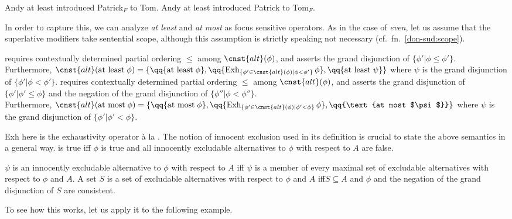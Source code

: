 \documentclass[output=paper]{langscibook}
\begin{document}
\ea
  \ea Andy at least introduced Patrick$_F$ to Tom.
  \ex Andy at least introduced Patrick to Tom$_F$.
  \z
\z

\noindent In order to capture this, we can analyze \textit{at least} and \textit{at most} as focus sensitive operators. As in the case of \textit{even}, let us assume that the superlative modifiers take sentential scope, although this assumption is strictly speaking not necessary (cf.\ fn.~\ref{don-sud:scope}).

\eanoraggedright
  \eanoraggedright
   requires contextually determined partial ordering $\leq$ among $\cnst{alt}(\phi)$, and asserts the grand disjunction of $\{\phi' | \phi \leq \phi'\}$.\smallskip\\Furthermore, $\cnst{alt}(\text{at least}\;\phi)=\{\qq{\text{at least} \;\phi}, \qq{\text{Exh}_{\{\phi'\in \cnst{alt}(\phi) | \phi <\phi' \}}\,\phi},\break \qq{\text{at least}\;\psi}\}$ where $\psi$ is the grand disjunction of $\{\phi' | \phi < \phi'\}$.
  \ex
  requires contextually determined partial ordering $\leq$ among $\cnst{alt}(\phi)$, and asserts the grand disjunction of $\{\phi' | \phi' \leq \phi\}$ and the negation of the grand disjunction of $\{\phi'' | \phi < \phi''\}$.\smallskip\\Furthermore, $\cnst{alt}(\text{at most}\;\phi)=\{\qq{\text{at most}\;\phi}, \qq{\text{Exh}_{\{\phi'\in \cnst{alt}(\phi) | \phi' <\phi \}}\,\phi},\break \qq{\text{at most $\psi$}}\}$ where $\psi$ is the grand disjunction of $\{\phi' | \phi' < \phi\}$.
  \z
\z

\noindent Exh here is the exhaustivity operator à la \citet{fox}. The notion of innocent exclusion used in its definition is crucial to state the above semantics in a general way.
\ea {} is true iff $\phi$ is true and all innocently excludable alternatives to $\phi$ with respect to $A$ are false.\z

\eanoraggedright
  \eanoraggedright $\psi$ is an innocently excludable alternative to $\phi$ with respect to $A$ iff $\psi$ is a member of every maximal set of excludable alternatives with respect to $\phi$ and $A$.
  \ex A set $S$ is a set of excludable alternatives with respect to $\phi$ and $A$ iff\linebreak $S\subseteq A$ and $\phi$ and the negation of the grand disjunction of $S$ are consistent.
  \z
\z

\noindent To see how this works, let us apply it to the following example.
\end{document}
